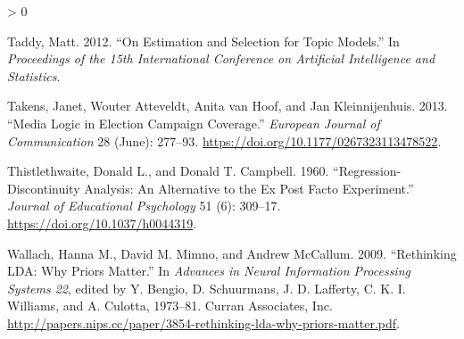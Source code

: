 \documentclass[
  12pt,
]{article}
\newlength{\cslhangindent}
\newenvironment{CSLReferences}[2] %
 {%
  \setlength{\parindent}{0pt}
  \ifodd #1 \everypar{\setlength{\hangindent}{\cslhangindent}}\ignorespaces\fi
  \ifnum #2 > 0
  \setlength{\parskip}{#2\baselineskip}
  \fi
 }%
 {}
\begin{document}
\begin{CSLReferences}{1}{0}
\leavevmode\hypertarget{ref-taddy_estimation_2012}{}%
Taddy, Matt. 2012. {``On Estimation and Selection for Topic Models.''}
In \emph{Proceedings of the 15th International Conference on Artificial
Intelligence and Statistics}.

\leavevmode\hypertarget{ref-takens_media_2013}{}%
Takens, Janet, Wouter Atteveldt, Anita van Hoof, and Jan Kleinnijenhuis.
2013. {``Media Logic in Election Campaign Coverage.''} \emph{European
Journal of Communication} 28 (June): 277--93.
\url{https://doi.org/10.1177/0267323113478522}.

\leavevmode\hypertarget{ref-thistlethwaite_regression-discontinuity_1960}{}%
Thistlethwaite, Donald L., and Donald T. Campbell. 1960.
{``Regression-Discontinuity Analysis: An Alternative to the Ex Post
Facto Experiment.''} \emph{Journal of Educational Psychology} 51 (6):
309--17. \url{https://doi.org/10.1037/h0044319}.

\leavevmode\hypertarget{ref-wallach_rethinking_2009}{}%
Wallach, Hanna M., David M. Mimno, and Andrew McCallum. 2009.
{``Rethinking {LDA}: Why Priors Matter.''} In \emph{Advances in Neural
Information Processing Systems 22}, edited by Y. Bengio, D. Schuurmans,
J. D. Lafferty, C. K. I. Williams, and A. Culotta, 1973--81. Curran
Associates, Inc.
\url{http://papers.nips.cc/paper/3854-rethinking-lda-why-priors-matter.pdf}.

\end{CSLReferences}
\end{document}
